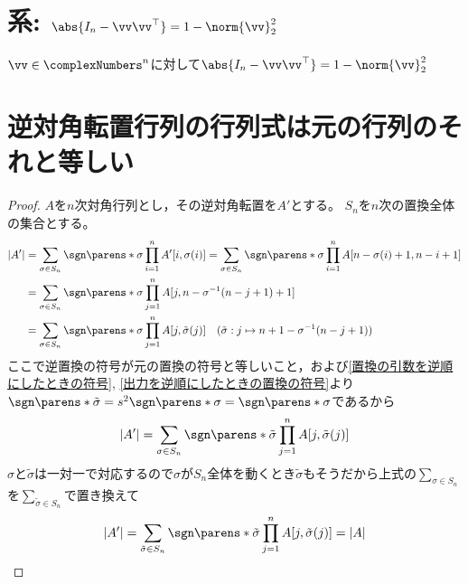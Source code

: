     \section{系: \texorpdfstring{$\abs{I_n-\vv\vv^\top} = 1-\norm{\vv}_2^2$}{|In-vv\string^| = 1 - ||v||\string^2}}
        \begin{shadebox}
            $\vv \in \complexNumbers^n$に対して$\abs{I_n-\vv\vv^\top} = 1-\norm{\vv}_2^2$
        \end{shadebox}
    \section{逆対角転置行列の行列式は元の行列のそれと等しい}
        \begin{proof}
            $A$を$n$次対角行列とし，その逆対角転置を$A'$とする。
            $S_n$を$n$次の置換全体の集合とする。
            \begin{align*}
                |A'| &= \sum_{\sigma\in S_n} \sgn\parens*{\sigma} \prod_{i=1}^n A'[i,\sigma(i)] = \sum_{\sigma\in S_n} \sgn\parens*{\sigma} \prod_{i=1}^n A[n-\sigma(i)+1, n-i+1] \\
                &= \sum_{\sigma\in S_n} \sgn\parens*{\sigma} \prod_{j=1}^n A[j, n- \sigma^{-1}(n-j+1)+1] \\
                &= \sum_{\sigma\in S_n} \sgn\parens*{\sigma} \prod_{j=1}^n A[j, \tilde\sigma(j)] \quad (\tilde\sigma: j \mapsto n+1-\sigma^{-1}(n-j+1))
            \end{align*}
            ここで逆置換の符号が元の置換の符号と等しいこと，および\ref{置換の引数を逆順にしたときの符号}, \ref{出力を逆順にしたときの置換の符号}より$\sgn\parens*{\tilde\sigma} = s^2\sgn\parens*{\sigma} = \sgn\parens*{\sigma}$であるから
            \[ |A'| = \sum_{\sigma\in S_n} \sgn\parens*{\tilde\sigma} \prod_{j=1}^n A[j, \tilde\sigma(j)] \]
            $\sigma$と$\tilde\sigma$は一対一で対応するので$\sigma$が$S_n$全体を動くとき$\tilde\sigma$もそうだから上式の$\sum_{\sigma\in S_n}$を$\sum_{\tilde\sigma\in S_n}$で置き換えて
            \[ |A'| = \sum_{\tilde\sigma\in S_n} \sgn\parens*{\tilde\sigma} \prod_{j=1}^n A[j, \tilde\sigma(j)] = |A| \]
        \end{proof}
